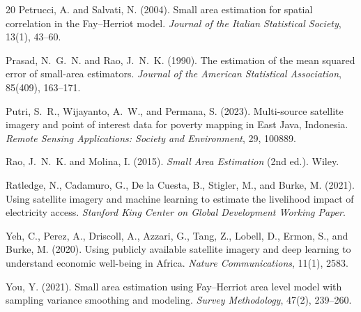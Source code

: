 \documentclass[11pt,a4paper]{article}
\begin{document}
\begin{thebibliography}{20}
Petrucci, A. and Salvati, N. (2004).
\newblock Small area estimation for spatial correlation in the Fay--Herriot model.
\newblock \emph{Journal of the Italian Statistical Society}, 13(1), 43--60.

Prasad, N.~G.~N. and Rao, J.~N.~K. (1990).
\newblock The estimation of the mean squared error of small-area estimators.
\newblock \emph{Journal of the American Statistical Association}, 85(409), 163--171.

Putri, S.~R., Wijayanto, A.~W., and Permana, S. (2023).
\newblock Multi-source satellite imagery and point of interest data for poverty mapping in East Java, Indonesia.
\newblock \emph{Remote Sensing Applications: Society and Environment}, 29, 100889.

Rao, J.~N.~K. and Molina, I. (2015).
\newblock \emph{Small Area Estimation} (2nd ed.).
\newblock Wiley.

Ratledge, N., Cadamuro, G., De la Cuesta, B., Stigler, M., and Burke, M. (2021).
\newblock Using satellite imagery and machine learning to estimate the livelihood impact of electricity access.
\newblock \emph{Stanford King Center on Global Development Working Paper}.

Yeh, C., Perez, A., Driscoll, A., Azzari, G., Tang, Z., Lobell, D., Ermon, S., and Burke, M. (2020).
\newblock Using publicly available satellite imagery and deep learning to understand economic well-being in Africa.
\newblock \emph{Nature Communications}, 11(1), 2583.

You, Y. (2021).
\newblock Small area estimation using Fay--Herriot area level model with sampling variance smoothing and modeling.
\newblock \emph{Survey Methodology}, 47(2), 239--260.

\end{thebibliography}
\end{document}
